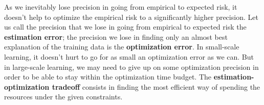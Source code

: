 As we inevitably lose precision in going from empirical to expected risk, it doesn’t help to optimize the empirical risk to a significantly higher precision. Let us call the precision that we lose in going from empirical to expected risk the \textbf{estimation error}; the precision we lose in finding only an almost best explanation of the training data is the \textbf{optimization error}. In small-scale learning, it doesn’t hurt to go for as small an optimization error as we can. But in large-scale learning, we may need to give up on some optimization precision in order to be able to stay within the optimization time budget. The \textbf{estimation-optimization tradeoff} consists in finding the most efficient way of spending the resources under the given constraints.